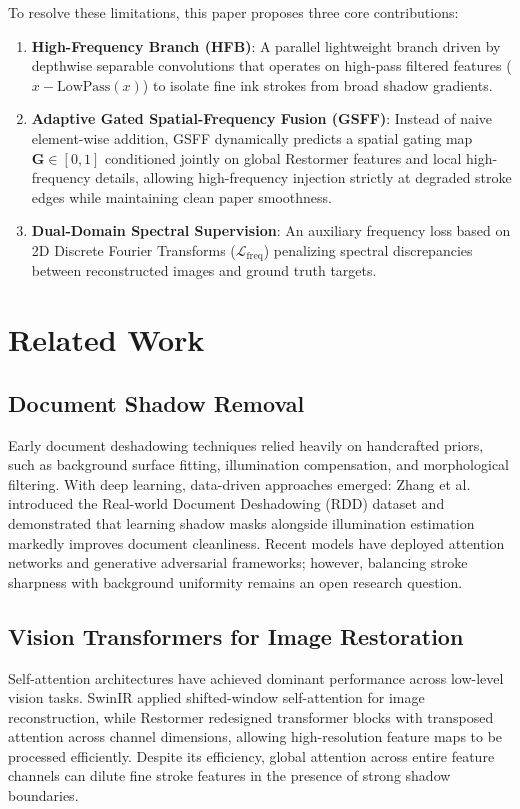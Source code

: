 \documentclass[conference]{IEEEtran}
\begin{document}
To resolve these limitations, this paper proposes three core contributions:
\begin{enumerate}
    \item \textbf{High-Frequency Branch (HFB)}: A parallel lightweight branch driven by depthwise separable convolutions that operates on high-pass filtered features ($x - \text{LowPass}(x)$) to isolate fine ink strokes from broad shadow gradients.
    \item \textbf{Adaptive Gated Spatial-Frequency Fusion (GSFF)}: Instead of naive element-wise addition, GSFF dynamically predicts a spatial gating map $\mathbf{G} \in [0, 1]$ conditioned jointly on global Restormer features and local high-frequency details, allowing high-frequency injection strictly at degraded stroke edges while maintaining clean paper smoothness.
    \item \textbf{Dual-Domain Spectral Supervision}: An auxiliary frequency loss based on 2D Discrete Fourier Transforms ($\mathcal{L}_{\text{freq}}$) penalizing spectral discrepancies between reconstructed images and ground truth targets.
\end{enumerate}

\section{Related Work}
\subsection{Document Shadow Removal}
Early document deshadowing techniques relied heavily on handcrafted priors, such as background surface fitting, illumination compensation, and morphological filtering. With deep learning, data-driven approaches emerged: Zhang et al. introduced the Real-world Document Deshadowing (RDD) dataset and demonstrated that learning shadow masks alongside illumination estimation markedly improves document cleanliness. Recent models have deployed attention networks and generative adversarial frameworks; however, balancing stroke sharpness with background uniformity remains an open research question.

\subsection{Vision Transformers for Image Restoration}
Self-attention architectures have achieved dominant performance across low-level vision tasks. SwinIR applied shifted-window self-attention for image reconstruction, while Restormer \cite{zamir2022restormer} redesigned transformer blocks with transposed attention across channel dimensions, allowing high-resolution feature maps to be processed efficiently. Despite its efficiency, global attention across entire feature channels can dilute fine stroke features in the presence of strong shadow boundaries.
\end{document}
